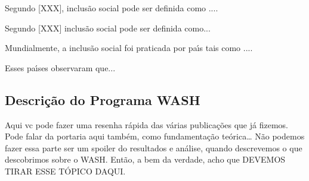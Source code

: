 \documentclass[
12pt,		%
openright,	%
twoside,  %
a4paper,			%
chapter=TITLE,		%
english,			%
french,				%
spanish,			%
brazil				%
]{USPSC-classe/USPSC}
\begin{document}
Segundo [XXX], inclus\~ao social pode ser definida como ....














Segundo [XXX] inclus\~ao social pode ser definida como...














Mundialmente, a inclus\~ao social foi praticada por pa\'{\i}s tais como ....














Esses pa\'{\i}ses observaram que...














\subsection[Descri\c{c}\~ao do Programa WASH]{Descri\c{c}\~ao do Programa WASH}\label{Descri\c{c}\~ao do Programa WASH}
Aqui vc pode fazer uma resenha r\'apida das v\'arias publica\c{c}\~oes que j\'a fizemos. Pode falar da portaria aqui tamb\'em, como fundamenta\c{c}\~ao te\'orica… N\~ao podemos fazer essa parte ser um spoiler do resultados e an\'alise, quando descrevemos o que descobrimos sobre o WASH. Ent\~ao, a bem da verdade, acho que DEVEMOS TIRAR ESSE T\'OPICO DAQUI.
\end{document}
